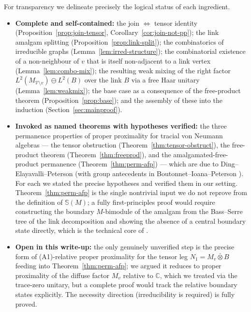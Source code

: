 \documentclass[11pt]{article}
\newcommand{\VV}{\mathcal V}
\begin{document}
For transparency we delineate precisely the logical status of each ingredient.

\begin{itemize}
\item \textbf{Complete and self-contained:} the join $\Leftrightarrow$ tensor identity
(Proposition~\ref{prop:join-tensor}, Corollary~\ref{cor:join-not-pp}); the link amalgam splitting
(Proposition~\ref{prop:link-split}); the combinatorics of irreducible graphs
(Lemma~\ref{lem:irred-structure}); the combinatorial existence of a non-neighbour of $v$ that is itself
non-adjacent to a link vertex (Lemma~\ref{lem:combo-mix}); the resulting weak mixing of the right factor
$L^2(M_{\VV\setminus v})\ominus L^2(B)$ over the link $B$ via a free Haar unitary (Lemma~\ref{lem:weakmix});
the base case as a consequence of the free-product theorem (Proposition~\ref{prop:base}); and the assembly of
these into the induction (Section~\ref{sec:mainproof}).

\item \textbf{Invoked as named theorems with hypotheses verified:} the three permanence properties of proper
proximality for tracial von Neumann algebras --- the tensor obstruction
(Theorem~\ref{thm:tensor-obstruct}), the free-product theorem (Theorem~\ref{thm:freeprod}), and the
amalgamated-free-product permanence (Theorem~\ref{thm:perm-afp}) --- which are due to Ding--Elayavalli--Peterson
\cite{DEP} (with group antecedents in Boutonnet--Ioana--Peterson \cite{BIP}). For each we stated the precise
hypotheses and verified them in our setting. Theorem~\ref{thm:perm-afp} is the single nontrivial input we do
not reprove from the definition of $\mathbb S(M)$; a fully first-principles proof would require constructing
the boundary $M$-bimodule of the amalgam from the Bass--Serre tree of the link decomposition and showing the
absence of a central boundary state directly, which is the technical core of \cite{DEP}.

\item \textbf{Open in this write-up:} the only genuinely unverified step is the precise form of (A1)-relative
proper proximality for the tensor leg $N_1=M_v\bar\otimes B$ feeding into Theorem~\ref{thm:perm-afp}; we
argued it reduces to proper proximality of the diffuse factor $M_v$ relative to $\mathbb C$, which we treated
via the trace-zero unitary, but a complete proof would track the relative boundary states explicitly. The
necessity direction (irreducibility is required) is fully proved.
\end{itemize}
\end{document}
